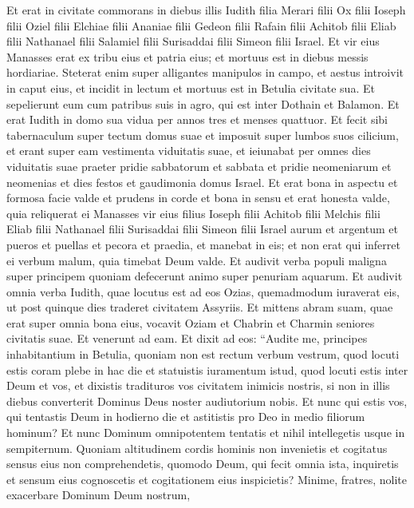 \begin{biblechapter}  
\verse Et erat in civitate commorans in diebus illis Iudith filia Merari filii Ox filii Ioseph filii Oziel filii Elchiae filii Ananiae filii Gedeon filii Rafain filii Achitob filii Eliab filii Nathanael filii Salamiel filii Surisaddai filii Simeon filii Israel. 
\verse Et vir eius Manasses erat ex tribu eius et patria eius; et mortuus est in diebus messis hordiariae. 
\verse Steterat enim super alligantes manipulos in campo, et aestus introivit in caput eius, et incidit in lectum et mortuus est in Betulia civitate sua. Et sepelierunt eum cum patribus suis in agro, qui est inter Dothain et Balamon. 
\verse Et erat Iudith in domo sua vidua per annos tres et menses quattuor. 
\verse Et fecit sibi tabernaculum super tectum domus suae et imposuit super lumbos suos cilicium, et erant super eam vestimenta viduitatis suae, 
\verse et ieiunabat per omnes dies viduitatis suae praeter pridie sabbatorum et sabbata et pridie neomeniarum et neomenias et dies festos et gaudimonia domus Israel. 
\verse Et erat bona in aspectu et formosa facie valde et prudens in corde et bona in sensu et erat honesta valde, quia reliquerat ei Manasses vir eius filius Ioseph filii Achitob filii Melchis filii Eliab filii Nathanael filii Surisaddai filii Simeon filii Israel aurum et argentum et pueros et puellas et pecora et praedia, et manebat in eis; 
\verse et non erat qui inferret ei verbum malum, quia timebat Deum valde. 
\verse Et audivit verba populi maligna super principem quoniam defecerunt animo super penuriam aquarum. Et audivit omnia verba Iudith, quae locutus est ad eos Ozias, quemadmodum iuraverat eis, ut post quinque dies traderet civitatem Assyriis.  
\verse Et mittens abram suam, quae erat super omnia bona eius, vocavit Oziam et Chabrin et Charmin seniores civitatis suae. 
\verse Et venerunt ad eam. Et dixit ad eos: “Audite me, principes inhabitantium in Betulia, quoniam non est rectum verbum vestrum, quod locuti estis coram plebe in hac die et statuistis iuramentum istud, quod locuti estis inter Deum et vos, et dixistis tradituros vos civitatem inimicis nostris, si non in illis diebus converterit Dominus Deus noster audiutorium nobis. 
\verse Et nunc qui estis vos, qui tentastis Deum in hodierno die et astitistis pro Deo in medio filiorum hominum? 
\verse Et nunc Dominum omnipotentem tentatis et nihil intellegetis usque in sempiternum. 
\verse Quoniam altitudinem cordis hominis non invenietis et cogitatus sensus eius non comprehendetis, quomodo Deum, qui fecit omnia ista, inquiretis et sensum eius cognoscetis et cogitationem eius inspicietis? Minime, fratres, nolite exacerbare Dominum Deum nostrum, 

\end{biblechapter}
